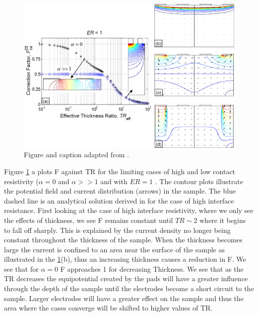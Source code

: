 
\begin{figure}[t]
  \centering
    \includegraphics[width=\textwidth]{fig/4pp/ER1.png}
 \caption{  Figure and caption adapted from \cite{Zimney2007CorrectionStudy}.}
 \label{ER1}
\end{figure}


Figure \ref{ER1} a plots F against TR for the limiting cases of high and low contact resistivity ($\alpha = 0$ and $\alpha >> 1$ and with $ER = 1$ . The contour plots illustrate the potential field and current distribution (arrows) in the sample. The blue dashed line is an analytical solution derived in \cite{} for the case of high interface resistance. First looking at the case of high interface resistivity, where we only see the effects of thickness, we see F remains constant until $TR \sim 2$ where it begins to fall off sharply. This is explained by the current density no longer being constant throughout the thickness of the sample. When the thickness becomes large the current is confined to an area near the surface of the sample as illustrated in the \ref{ER1}(b), thus an increasing thickness causes a reduction in F. 
We see that for $\alpha = 0$ F approaches 1 for decreasing Thickness. We see that as the TR decreases the equipotential created by the pads will have a greater influence through the depth of the sample until the electrodes become a short circuit to the sample. Larger electrodes will have a greater effect on the sample and thus the area where the cases converge will be shifted to higher values of TR. 

